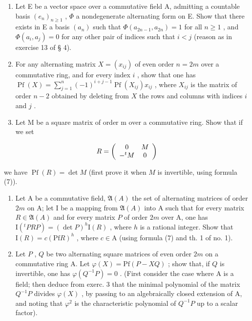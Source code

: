 \begin{enumerate}
\def\labelenumi{\arabic{enumi})}
\setcounter{enumi}{3}
\item
  Let E be a vector space over a commutative field A, admitting a countable basis \((e_n)_{n\geqslant 1}\) , \(\Phi\) a nondegenerate alternating form on E. Show that there exists in E a basis \((a_n)\) such that \(\Phi(a_{2n-1}, a_{2n}) = 1\) for all \(n\geqslant 1\) , and \(\Phi(a_i, a_j) = 0\) for any other pair of indices such that \(i < j\) (reason as in exercise 13 of § 4).
\item
  For any alternating matrix \(X = (x_{ij})\) of even order \(n = 2m\) over a commutative ring, and for every index \(i\) , show that one has \(\operatorname{Pf}(X) = \sum_{j=1}^{n} (-1)^{i+j-1} \operatorname{Pf}(X_{ij}) x_{ij}\) , where \(X_{ij}\) is the matrix of order \(n - 2\) obtained by deleting from \(X\) the rows and columns with indices \(i\) and \(j\) .
\item
  Let M be a square matrix of order m over a commutative ring. Show that if we set
\end{enumerate}

\[
R = \left( \begin{array}{c c} 0 & M \\ - ^ {t} M & 0 \end{array} \right)
\]

we have \(\operatorname{Pf}(R) = \det M\) (first prove it when \(M\) is invertible, using formula (7)).

\begin{enumerate}
\def\labelenumi{\arabic{enumi})}
\setcounter{enumi}{6}
\item
  Let A be a commutative field, \(\mathfrak{A}(A)\) the set of alternating matrices of order \(2m\) on A; let I be a mapping from \(\mathfrak{A}(A)\) into A such that for every matrix \(R\in\mathfrak{A}(A)\) and for every matrix \(P\) of order \(2m\) over A, one has \(\mathrm{I}(^{t}PRP)=(\det P)^{h}\mathrm{I}(R)\) , where \(h\) is a rational integer. Show that \(\mathrm{I}(R)=c(\mathrm{Pf}R)^{h}\) , where \(c\in\mathrm{A}\) (using formula (7) and th. 1 of no. 1).
\item
  Let \(P\) , \(Q\) be two alternating square matrices of even order \(2m\) on a commutative ring A. Let \(\varphi(X) = \mathrm{Pf}(P - XQ)\) ; show that, if \(Q\) is invertible, one has \(\varphi(Q^{-1}P)=0\) . (First consider the case where A is a field; then deduce from exerc. 3 that the minimal polynomial of the matrix \(Q^{-1}P\) divides \(\varphi(X)\) , by passing to an algebraically closed extension of A, and noting that \(\varphi^{2}\) is the characteristic polynomial of \(Q^{-1}P\) up to a scalar factor).
\end{enumerate}

